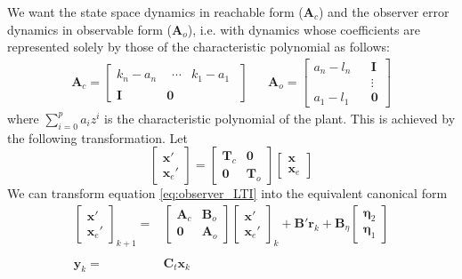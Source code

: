 \documentclass[sigconf]{llncs}
\newcommand{\mat}[1]{\boldsymbol{#1}}
\renewcommand{\vec}[1]{\boldsymbol{#1}}
\begin{document}
We want the state space dynamics in reachable form ($\mat{A}_c$) and the observer error dynamics in observable form ($\mat{A}_o$), i.e. with dynamics whose coefficients are represented solely by those of the characteristic polynomial as follows:
\begin{align*}
\mat{A}_{c}=\left[
\begin{array}{cc}
k_n-a_n&\begin{array}{cc}\cdots&k_1-a_1\end{array}\\
\mat{I}&\mat{0}
\end{array}\right]&&
\mat{A}_{o}=\left[
\begin{array}{ccc}
a_n-l_n&&\mat{I}\\
&&\vdots\\
a_1-l_1&&\mat{0}
\end{array}\right]
\end{align*}
where $\sum_{i=0}^p a_iz^i$ is the characteristic polynomial of the plant.
This is achieved by the following transformation. Let
\begin{equation}
\left[\begin{array}{c}\vec{x}'\\ \vec{x}_e'\end{array}\right]=
\left[\begin{array}{cc}\mat{T}_c & \mat{0}\\\mat{0} & \mat{T}_o\end{array}\right] 
\left[\begin{array}{c}\vec{x}\\ \vec{x}_e\end{array}\right]
\end{equation}
We can transform equation \eqref{eq:observer_LTI} into the equivalent canonical form
\begin{align}
\left [\begin{array}{c}\vec{x}'\\ \vec{x}_e' \end{array}\right]_{k+1}
=& \left [\begin{array}{cc}\mat{A}_{c}&\mat{B}_{o}\\ \mat{0}&\mat{A}_{o}\end{array}\right]
\left [\begin{array}{c}\vec{x}'\\ \vec{x}_e' \end{array}\right]_k
+\mat{B}' \vec{r}_k
+\mat{B}_{\eta}\left [\begin{array}{c}\vec{\eta}_2\\ \vec{\eta}_1\end{array}\right]\nonumber\\
\nonumber\\
\vec{y}_k
=& \mat{C}_{t}\vec{x}_k%
\label{eq:observer_LTI_cf}
\end{align}
\end{document}
